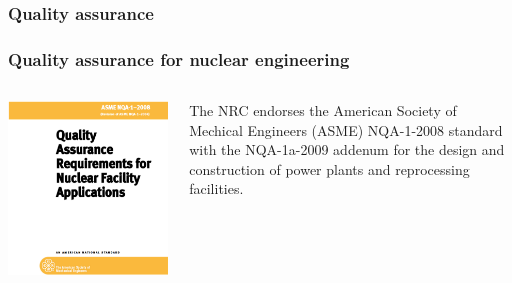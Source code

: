 \documentclass[12pt]{beamer}
\begin{document}
\begin{frame}[fragile]
\frametitle{Quality assurance}

\end{frame}
\begin{frame}[fragile]
\frametitle{Quality assurance for nuclear engineering}

\begin{columns}[T]
\begin{column}{0.5\textwidth}
\includegraphics[width=\textwidth]{figures/nqa-1-2008.png}
\end{column}
\begin{column}{0.5\textwidth}
The NRC \cite{NRC} endorses the American Society of Mechical Engineers (ASME)
NQA-1-2008 \cite{nqa} standard with the NQA-1a-2009 \cite{add} addenum for the 
design and construction of power plants and reprocessing facilities.
\end{column}
\end{columns}


\end{frame}
\end{document}
